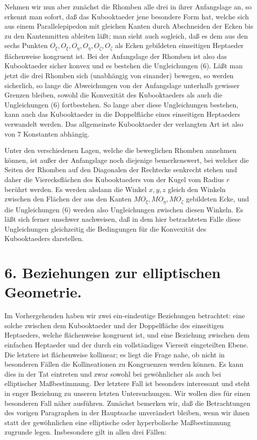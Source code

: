 \documentclass[11pt,a4paper]{article}
\begin{document}
Nehmen wir nun aber zun\"achst die Rhomben alle drei in ihrer Anfangslage an, so erkennt man sofort, da\ss{} das Kubooktaeder jene besondere Form hat, welche sich aus einem Parallelepipedon mit gleichen Kanten durch Abschneiden der Ecken bis zu den Kantenmitten ableiten l\"a\ss{}t; man sieht auch sogleich, da\ss{} es dem aus den sechs Punkten $O_\xi,O_\xi,O_\eta,O_\eta,O_\zeta,O_\zeta$ als Ecken gebildeten einseitigen Heptaeder fl\"achenweise kongruent ist. Bei der Anfangslage der Rhomben ist also das Kubooktaeder sicher konvex und es bestehen die Ungleichungen (6). L\"a\ss{}t man jetzt die drei Rhomben sich (unabh\"angig von einander) bewegen, so werden sicherlich, so lange die Abweichungen von der Anfangslage unterhalb gewisser Grenzen bleiben, sowohl die Konvexit\"at des Kubooktaeders als auch die Ungleichungen (6) fortbestehen. So lange aber diese Ungleichungen bestehen, kann auch das Kubooktaeder in die Doppelfl\"ache eines einseitigen Heptaeders verwandelt werden. Das allgemeinste Kubooktaeder der verlangten Art ist also von $7$ Konstanten abh\"angig.

Unter den verschiedenen Lagen, welche die beweglichen Rhomben annehmen k\"onnen, ist au\ss{}er der Anfangslage noch diejenige bemerkenswert, bei welcher die Seiten der Rhomben auf den Diagonalen der Rechtecke senkrecht stehen und daher die Vierecksfl\"achen des Kubooktaeders von der Kugel vom Radius $r$ ber\"uhrt werden. Es werden alsdann die Winkel $x,y,z$ gleich den Winkeln zwischen den Fl\"achen der aus den Kanten $MO_\xi,MO_\eta,MO_\zeta$ gebildeten Ecke, und die Ungleichungen (6) werden also Ungleichungen zwischen diesen Winkeln. Es l\"a\ss{}t sich ferner unschwer nachweisen, da\ss{} in dem hier betrachteten Falle diese Ungleichungen gleichzeitig die Bedingungen f\"ur die Konvexit\"at des Kubooktaeders darstellen.

\section*{6. Beziehungen zur elliptischen Geometrie.}

Im Vorhergehenden haben wir zwei ein-eindeutige Beziehungen betrachtet: eine solche zwischen dem Kubooktaeder und der Doppelfl\"ache des einseitigen Heptaeders, welche fl\"achenweise kongruent ist, und eine Beziehung zwischen dem einfachen Heptaeder und der durch ein vollst\"andiges Vierseit eingeteilten Ebene. Die letztere ist fl\"achenweise kollinear; es liegt die Frage nahe, ob nicht in besonderen F\"allen die Kollineationen zu Kongruenzen werden k\"onnen. Es kann dies in der Tat eintreten und zwar sowohl bei gew\"ohnlicher als auch bei elliptischer Ma\ss{}bestimmung. Der letztere Fall ist besonders interessant und steht in enger Beziehung zu unseren letzten Untersuchungen. Wir wollen dies f\"ur einen besonderen Fall n\"aher ausf\"uhren. Zun\"achst bemerken wir, da\ss{} die Betrachtungen des vorigen Paragraphen in der Hauptsache unver\"andert bleiben, wenn wir ihnen statt der gew\"ohnlichen eine elliptische oder hyperbolische Ma\ss{}bestimmung zugrunde legen. Insbesondere gilt in allen drei F\"allen:
\end{document}
